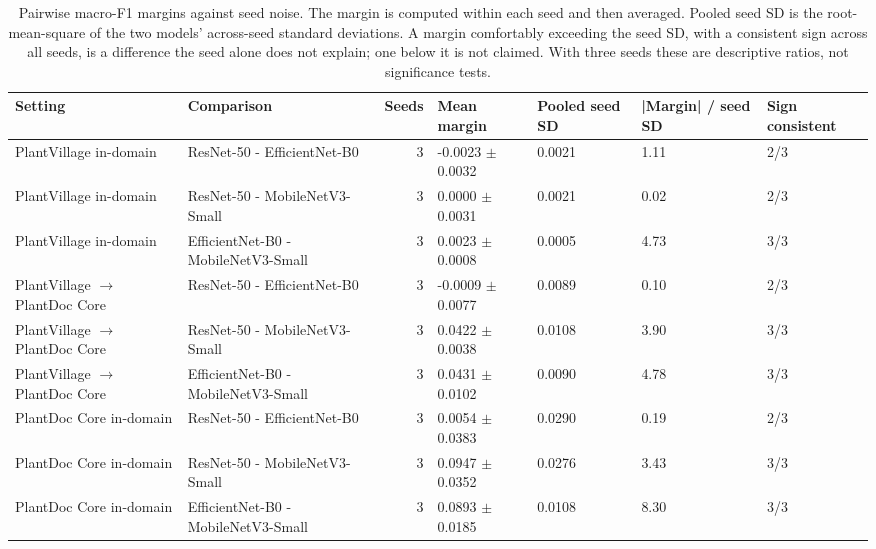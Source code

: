 \begin{table}[htbp]
\caption{Pairwise macro-F1 margins against seed noise. The margin is computed within each seed and then averaged. Pooled seed SD is the root-mean-square of the two models' across-seed standard deviations. A margin comfortably exceeding the seed SD, with a consistent sign across all seeds, is a difference the seed alone does not explain; one below it is not claimed. With three seeds these are descriptive ratios, not significance tests.}
\label{tab:ranking-margins}
\begin{tabular}{llrllll}
\toprule
Setting & Comparison & Seeds & Mean margin & Pooled seed SD & |Margin| / seed SD & Sign consistent \\
\midrule
PlantVillage in-domain & ResNet-50 - EfficientNet-B0 & 3 & -0.0023 $\pm$ 0.0032 & 0.0021 & 1.11 & 2/3 \\
PlantVillage in-domain & ResNet-50 - MobileNetV3-Small & 3 & 0.0000 $\pm$ 0.0031 & 0.0021 & 0.02 & 2/3 \\
PlantVillage in-domain & EfficientNet-B0 - MobileNetV3-Small & 3 & 0.0023 $\pm$ 0.0008 & 0.0005 & 4.73 & 3/3 \\
PlantVillage $\rightarrow$ PlantDoc Core & ResNet-50 - EfficientNet-B0 & 3 & -0.0009 $\pm$ 0.0077 & 0.0089 & 0.10 & 2/3 \\
PlantVillage $\rightarrow$ PlantDoc Core & ResNet-50 - MobileNetV3-Small & 3 & 0.0422 $\pm$ 0.0038 & 0.0108 & 3.90 & 3/3 \\
PlantVillage $\rightarrow$ PlantDoc Core & EfficientNet-B0 - MobileNetV3-Small & 3 & 0.0431 $\pm$ 0.0102 & 0.0090 & 4.78 & 3/3 \\
PlantDoc Core in-domain & ResNet-50 - EfficientNet-B0 & 3 & 0.0054 $\pm$ 0.0383 & 0.0290 & 0.19 & 2/3 \\
PlantDoc Core in-domain & ResNet-50 - MobileNetV3-Small & 3 & 0.0947 $\pm$ 0.0352 & 0.0276 & 3.43 & 3/3 \\
PlantDoc Core in-domain & EfficientNet-B0 - MobileNetV3-Small & 3 & 0.0893 $\pm$ 0.0185 & 0.0108 & 8.30 & 3/3 \\
\bottomrule
\end{tabular}
\end{table}
